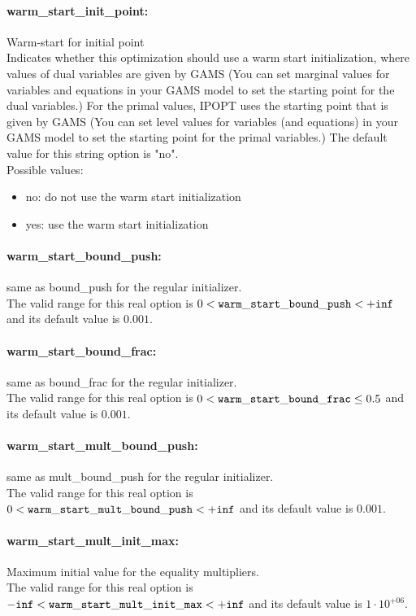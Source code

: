 \paragraph{warm\_start\_init\_point:} Warm-start for initial point $\;$ \\
 Indicates whether this optimization should use a warm start initialization, where values of dual variables are given by GAMS (You can set marginal values for variables and equations in your GAMS model to set the starting point for the dual variables.)
For the primal values, IPOPT uses the starting point that is given by GAMS (You can set level values for variables (and equations) in your GAMS model to set the starting point for the primal variables.)
The default value for this string option is "no".
\\ 
Possible values:
\begin{itemize}
   \item no: do not use the warm start initialization
   \item yes: use the warm start initialization
\end{itemize}

\paragraph{warm\_start\_bound\_push:} same as bound\_push for the regular initializer. $\;$ \\
 The valid range for this real option is 
$0 <  {\tt warm\_start\_bound\_push } <  {\tt +inf}$
and its default value is $0.001$.


\paragraph{warm\_start\_bound\_frac:} same as bound\_frac for the regular initializer. $\;$ \\
 The valid range for this real option is 
$0 <  {\tt warm\_start\_bound\_frac } \le 0.5$
and its default value is $0.001$.


\paragraph{warm\_start\_mult\_bound\_push:} same as mult\_bound\_push for the regular initializer. $\;$ \\
 The valid range for this real option is 
$0 <  {\tt warm\_start\_mult\_bound\_push } <  {\tt +inf}$
and its default value is $0.001$.


\paragraph{warm\_start\_mult\_init\_max:} Maximum initial value for the equality multipliers. $\;$ \\
 The valid range for this real option is 
${\tt -inf} <  {\tt warm\_start\_mult\_init\_max } <  {\tt +inf}$
and its default value is $1 \cdot 10^{+06}$.

